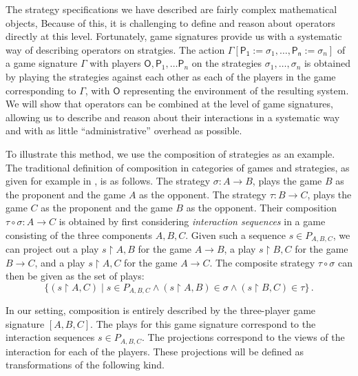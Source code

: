 \documentclass[format=sigplan,authordraft]{acmart}
\newcommand{\kw}[1]{\ensuremath{ \mathsf{#1} }}
\begin{document}
The strategy specifications we have described
are fairly complex mathematical objects,
Because of this, it is challenging to
define and reason about operators
directly at this level.
Fortunately,
game signatures provide us with a systematic way
of describing operators on stratgies.
The action
$\Gamma[\kw{P_1} := \sigma_1, \ldots, \kw{P_n} := \sigma_n]$
of a game signature $\Gamma$ with players
$\kw{O}, \kw{P}_1, \ldots \kw{P}_n$
on the strategies
$\sigma_1, \ldots, \sigma_n$
is obtained by playing the strategies
against each other as each of the players
in the game corresponding to $\Gamma$,
with $\kw{O}$ representing the environment
of the resulting system.
We will show that operators can be combined
at the level of game signatures,
allowing us to describe and reason about their interactions
in a systematic way
and with as little ``administrative'' overhead as possible.

To illustrate this method,
we use the composition of strategies as an example.
The traditional definition of composition
in categories of games and strategies,
as given for example in \cite{gamesem99},
is as follows.
The strategy $\sigma : A \rightarrow B$,
plays the game $B$ as the proponent
and the game $A$ as the opponent.
The strategy $\tau : B \rightarrow C$,
plays the game $C$ as the proponent
and the game $B$ as the opponent.
Their composition $\tau \circ \sigma : A \rightarrow C$
is obtained by first considering \emph{interaction sequences}
in a game consisting of the three components $A, B, C$.
Given such a sequence $s \in P_{A,B,C}$,
we can project out
a play $s \restriction A,B$ for the game $A \rightarrow B$,
a play $s \restriction B,C$ for the game $B \rightarrow C$, and
a play $s \restriction A,C$ for the game $A \rightarrow C$.
The composite strategy $\tau \circ \sigma$
can then be given as the set of plays:
\[
    \{ (s \restriction A,C) \mid
       s \in P_{A,B,C} \wedge
       (s \restriction A,B) \in \sigma \wedge
       (s \restriction B,C) \in \tau \} \,.
\]

In our setting,
composition is entirely described by
the three-player game signature $[A,B,C]$.
The plays for this game signature
correspond to the interaction sequences $s \in P_{A,B,C}$.
The projections correspond to the views
of the interaction for each of the players.
These projections will be defined as
transformations of the following kind.
\end{document}
